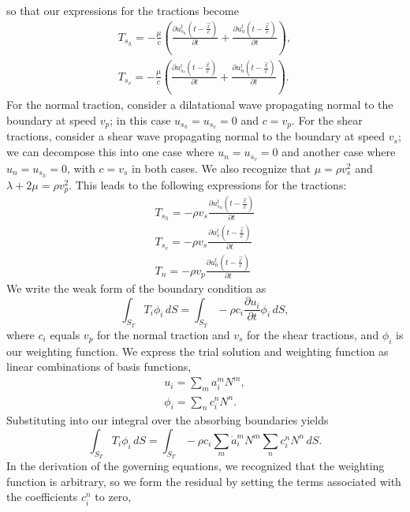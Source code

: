 so that our expressions for the tractions become
\begin{gather}
T_{s_{h}}=-\frac{\mu}{c}\left(\frac{\partial u_{s_{h}}^{t}(t-\frac{\vec{x}}{c})}{\partial t}+\frac{\partial u_{n}^{t}(t-\frac{\vec{x}}{c})}{\partial t}\right),\\
T_{s_{v}}=-\frac{\mu}{c}\left(\frac{\partial u_{s_{v}}^{t}(t-\frac{\vec{x}}{c})}{\partial t}+\frac{\partial u_{n}^{t}(t-\frac{\vec{x}}{c})}{\partial t}\right).
\end{gather}
For the normal traction, consider a dilatational wave propagating
normal to the boundary at speed $v_{p}$; in this case $u_{s_{h}}=u_{s_{v}}=0$
and $c=v_{p}$. For the shear tractions, consider a shear wave propagating
normal to the boundary at speed $v_{s}$; we can decompose this into
one case where $u_{n}=u_{s_{v}}=0$ and another case where $u_{n}=u_{s_{h}}=0$,
with $c=v_{s}$ in both cases. We also recognize that $\mu=\rho v_{s}^{2}$
and $\lambda+2\mu=\rho v_{p}^{2}$. This leads to the following expressions
for the tractions:
\begin{gather}
T_{s_{h}}=-\rho v_{s}\frac{\partial u_{s_{h}}^{t}(t-\frac{\vec{x}}{c})}{\partial t}\\
T_{s_{v}}=-\rho v_{s}\frac{\partial u_{v}^{t}(t-\frac{\vec{x}}{c})}{\partial t}\\
T_{n}=-\rho v_{p}\frac{\partial u_{n}^{t}(t-\frac{\vec{x}}{c})}{\partial t}
\end{gather}
We write the weak form of the boundary condition as
\[
\int_{S_{T}}T_{i}\phi_{i}\, dS=\int_{S_{T}}-\rho c_{i}\frac{\partial u_{i}}{\partial t}\phi_{i}\, dS,
\]
where $c_{i}$ equals $v_{p}$ for the normal traction and $v_{s}$
for the shear tractions, and $\phi_{i}$ is our weighting function.
We express the trial solution and weighting function as linear combinations
of basis functions,
\begin{gather}
u_{i}=\sum_{m}a_{i}^{m}N^{m},\\
\phi_{i}=\sum_{n}c_{i}^{n}N^{n}.
\end{gather}
Substituting into our integral over the absorbing boundaries yields
\begin{equation}
\int_{S_{T}}T_{i}\phi_{i}\, dS=\int_{S_{T}}-\rho c_{i}\sum_{m}\dot{a}_{i}^{m}N^{m}\sum_{n}c_{i}^{n}N^{n}\, dS.
\end{equation}
In the derivation of the governing equations, we recognized that the
weighting function is arbitrary, so we form the residual by setting
the terms associated with the coefficients $c_{i}^{n}$ to zero,

